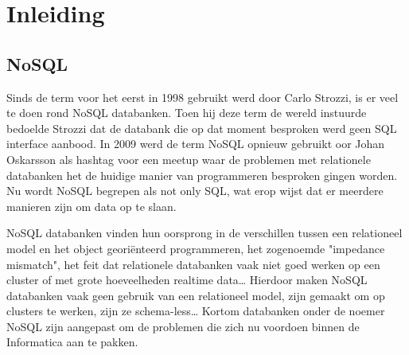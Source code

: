 \chapter{Inleiding}
\label{ch:inleiding}



\section{NoSQL}
Sinds de term voor het eerst in 1998 gebruikt werd door Carlo Strozzi, is er veel te doen rond NoSQL databanken.
Toen hij deze term de wereld instuurde bedoelde Strozzi dat de databank die op dat moment besproken werd geen SQL interface aanbood.
In 2009 werd de term NoSQL opnieuw gebruikt oor Johan Oskarsson als hashtag voor een meetup waar de problemen met relationele databanken het de huidige manier van programmeren besproken gingen worden.
Nu wordt NoSQL begrepen als not only SQL, wat erop wijst dat er meerdere manieren zijn om data op te slaan. \citep{Fowler2013Introduction}

NoSQL databanken vinden hun oorsprong in de verschillen tussen een relationeel model en het object georiënteerd programmeren, het zogenoemde "impedance mismatch", het feit dat relationele databanken vaak niet goed werken op een cluster of met grote hoeveelheden realtime data\dots
Hierdoor maken NoSQL databanken vaak geen gebruik van een relationeel model, zijn gemaakt om op clusters te werken, zijn ze schema-less\dots
Kortom databanken onder de noemer NoSQL zijn aangepast om de problemen die zich nu voordoen binnen de Informatica aan te pakken. \citep{Fowler2012NoSQLDef}

